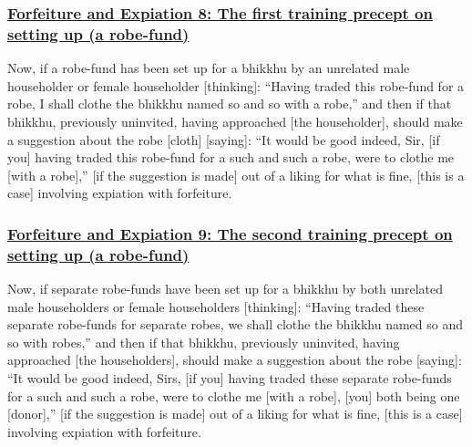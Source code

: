 \subsubsection*{\hyperref[np8]{Forfeiture and Expiation 8: The first training precept on setting up (a robe-fund)}}
\label{forf-exp8}
Now, if a robe-fund has been set up for a bhikkhu by an unrelated male householder or female householder [thinking]: ``Having traded this robe-fund for a robe, I shall clothe the bhikkhu named so and so with a robe,'' and then if that bhikkhu, previously uninvited, having approached [the householder], should make a suggestion about the robe [cloth] [saying]: ``It would be good indeed, Sir, [if you] having traded this robe-fund for a such and such a robe, were to clothe me [with a robe],'' [if the suggestion is made] out of a liking for what is fine, [this is a case] involving expiation with forfeiture.

\subsubsection*{\hyperref[np9]{Forfeiture and Expiation 9: The second training precept on setting up (a robe-fund)}}
\label{forf-exp9}
Now, if separate robe-funds have been set up for a bhikkhu by both unrelated male householders or female householders [thinking]: ``Having traded these separate robe-funds for separate robes, we shall clothe the bhikkhu named so and so with robes,'' and then if that bhikkhu, previously uninvited, having approached [the householders], should make a suggestion about the robe [saying]: ``It would be good indeed, Sirs, [if you] having traded these separate robe-funds for a such and such a robe, were to clothe me [with a robe], [you] both being one [donor],'' [if the suggestion is made] out of a liking for what is fine, [this is a case] involving expiation with forfeiture.

